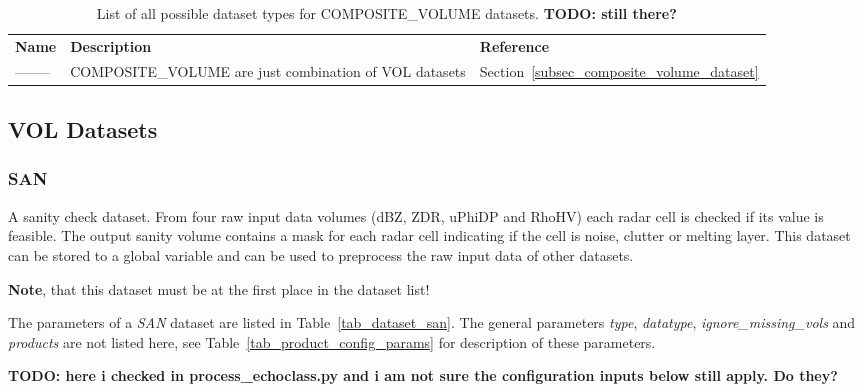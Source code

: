 \documentclass[a4paper,11pt,pdftex,twoside]{scrartcl}
\renewcommand{\bf}{\normalfont \bfseries}
\begin{document}
{{{\begin{table}[H]
\begin{tabularx}{\textwidth}{lXl}
\bf{Name}     & \bf{Description}                                & \bf{Reference}\\
--------   & COMPOSITE\_VOLUME are just combination of VOL datasets  & Section~\ref{subsec_composite_volume_dataset}\\
\end{tabularx}
\caption{List of all possible dataset types for COMPOSITE\_VOLUME datasets. {\bf TODO: still there?}}
\label{tab_datasets_COMPOSITE_VOLUME}
\end{table}

\subsection{VOL Datasets}

\subsubsection{SAN}
\label{subsec_san}

A sanity check dataset. From four raw input data volumes (dBZ, ZDR, uPhiDP and RhoHV)
each radar cell is checked if its value is feasible. The output sanity volume
contains a mask for each radar cell indicating if the cell is noise, clutter
or melting layer. This dataset can be stored to a global variable and can be used to preprocess
the raw input data of other datasets.

{\bf Note}, that this dataset must be at the first place in the dataset list!

The parameters of a \emph{SAN} dataset are listed in Table~\ref{tab_dataset_san}.
The general parameters \emph{type}, \emph{datatype}, \emph{ignore\_missing\_vols}
and \emph{products} are not listed here, see Table~\ref{tab_product_config_params} for
description of these parameters.

{\bf TODO: here i checked in process\_echoclass.py and i am not sure the configuration inputs below still apply. Do they?}

}}}
\end{document}
